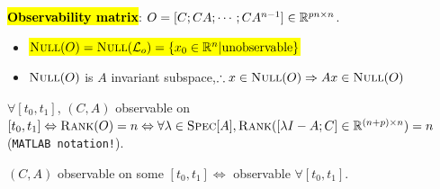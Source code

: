 \begin{Definition}
\textbf{\hl{Observability matrix}}: $O=[C;CA;\cdots;CA^{n-1}]\in\mathbb R^{pn\times n}$.
\end{Definition}
\begin{Theorem}
\begin{itemize}[leftmargin=3mm]
  \item \hspace{-1.5mm}\hl{$\textsc{Null}(O)=\textsc{Null}(\mathcal L_o)=\{x_0\in\mathbb R^n | \text{unobservable}\}$}
  \item \hspace{-1.5mm}$\textsc{Null}(O)$ is $A$ invariant subspace,$\therefore x\in\textsc{Null}(O)\Rightarrow Ax\in\textsc{Null}(O)$
\end{itemize}
\end{Theorem}
\begin{Theorem}
$\forall [t_0,t_1]$, $(C,A)$ observable on $[t_0,t_1]\Leftrightarrow\textsc{Rank}(O)=n\Leftrightarrow\forall\lambda\in\textsc{Spec}[A],\textsc{Rank}([\lambda I-A;C]\in\mathbb R^{(n+p)\times n})=n$ (\texttt{MATLAB notation!}).
\end{Theorem}
\begin{Corollary}
$(C,A)$ observable on some $[t_0,t_1]\Leftrightarrow$ observable $\forall [t_0,t_1]$.
\end{Corollary}
